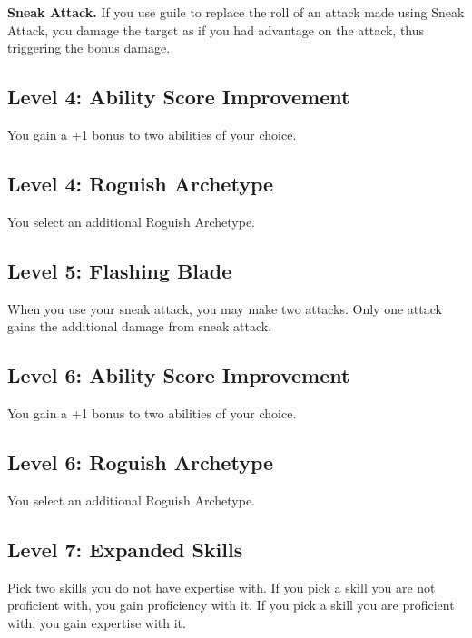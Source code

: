 \documentclass[12pt,letterpaper,twocolumn,openany,nodeprecatedcode,bg=none]{dndbook}
\begin{document}
\textbf{Sneak Attack.} If you use guile to replace the roll of an attack
made using Sneak Attack, you damage the target as if you had advantage
on the attack, thus triggering the bonus damage.

\subsection{Level 4: Ability Score
Improvement}\label{level-4-ability-score-improvement}

You gain a +1 bonus to two abilities of your choice.

\subsection{Level 4: Roguish Archetype}\label{level-4-roguish-archetype}

You select an additional Roguish Archetype.

\subsection{Level 5: Flashing Blade}\label{level-5-flashing-blade}

When you use your sneak attack, you may make two attacks. Only one
attack gains the additional damage from sneak attack.

\subsection{Level 6: Ability Score
Improvement}\label{level-6-ability-score-improvement}

You gain a +1 bonus to two abilities of your choice.

\subsection{Level 6: Roguish Archetype}\label{level-6-roguish-archetype}

You select an additional Roguish Archetype.

\subsection{Level 7: Expanded Skills}\label{level-7-expanded-skills}

Pick two skills you do not have expertise with. If you pick a skill you
are not proficient with, you gain proficiency with it. If you pick a
skill you are proficient with, you gain expertise with it.
\end{document}
